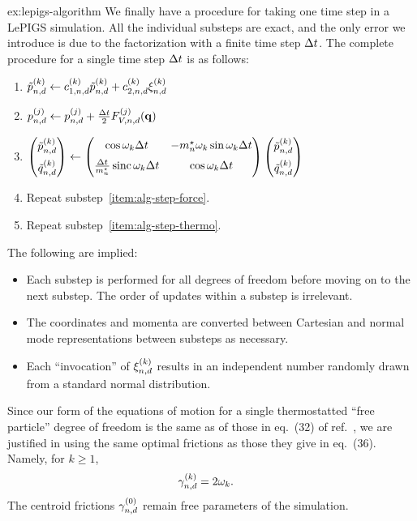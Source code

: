 \begin{DefAnswer}{ex:lepigs-algorithm}
	We finally have a procedure for taking one time step in a LePIGS simulation.
	All the individual substeps are exact, and the only error we introduce is due to the factorization with a finite time step $\Delta t$.
	The complete procedure for a single time step $\Delta t$ is as follows:
	\begin{enumerate}[itemsep=1 mm]
		\item $\tilde{p}_{n,d}^{(k)} \gets c_{1,n,d}^{(k)} \tilde{p}_{n,d}^{(k)} + c_{2,n,d}^{(k)} \xi_{n,d}^{(k)}$ \label{item:alg-step-thermo}
		\item $p_{n,d}^{(j)} \gets p_{n,d}^{(j)} + \frac{\Delta t}{2} F_{V,n,d}^{(j)}(\bm{\mathbf{q}})$ \label{item:alg-step-force}
		\item $
			\begin{pmatrix}
				\tilde{p}_{n,d}^{(k)} \\[2 mm]
				\tilde{q}_{n,d}^{(k)}
			\end{pmatrix}
			\gets \begin{pmatrix}
					\cos{\omega_k \Delta t} & -{m}^\star_n \omega_k \sin{\omega_k \Delta t} \\[2 mm]
					\frac{\Delta t}{{m}^\star_n} \operatorname{sinc}{\omega_k \Delta t} & \cos{\omega_k \Delta t}
				\end{pmatrix}
				\begin{pmatrix}
					\tilde{p}_{n,d}^{(k)} \\[2 mm]
					\tilde{q}_{n,d}^{(k)}
				\end{pmatrix}
			$
		\item Repeat substep~\ref{item:alg-step-force}.
		\item Repeat substep~\ref{item:alg-step-thermo}.
	\end{enumerate}
	The following are implied:
	\begin{itemize}
		\item Each substep is performed for all degrees of freedom before moving on to the next substep.
			The order of updates within a substep is irrelevant.
		\item The coordinates and momenta are converted between Cartesian and normal mode representations between substeps as necessary.
		\item Each ``invocation'' of $\xi_{n,d}^{(k)}$ results in an independent number randomly drawn from a standard normal distribution.
	\end{itemize}

	Since our form of the equations of motion for a single thermostatted ``free particle'' degree of freedom is the same as of those in eq.~(32) of ref.~\cite{ceriotti2010efficient}, we are justified in using the same optimal frictions as those they give in eq.~(36).
	Namely, for $k \ge 1$,
	\begin{align}
		\gamma_{n,d}^{(k)}
		&= 2 \omega_k.
	\end{align}
	The centroid frictions $\gamma_{n,d}^{(0)}$ remain free parameters of the simulation.
\end{DefAnswer}

